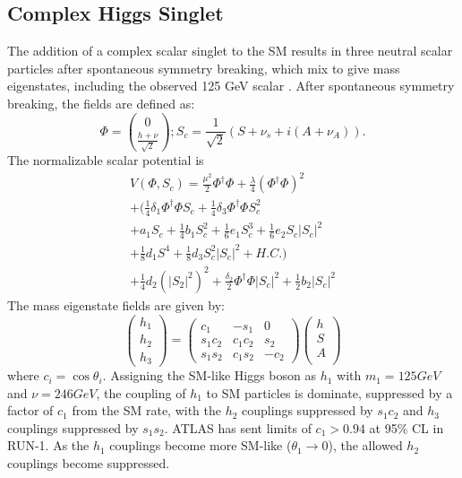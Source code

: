 \subsection{Complex Higgs Singlet}
The addition of a complex scalar singlet to the SM results in three neutral scalar particles after spontaneous symmetry breaking, which mix to give mass eigenstates, including the observed 125 GeV scalar \cite{PhysRevD.97.015022}.\linebreak
\indent After spontaneous symmetry breaking, the fields are defined as:
\begin{equation}
\Phi = \binom{0}{\frac{h+\nu}{\sqrt{2}}}; S_{c} = \frac{1}{\sqrt{2}}(S+\nu_{s} + i(A + \nu_{A})).
\end{equation}
The normalizable scalar potential is
\begin{equation}
\begin{split}
V(\Phi,S_{c}) = \frac{\mu^{2}}{2}\Phi^{\dagger}\Phi + \frac{\lambda}{4}(\Phi^{\dagger}\Phi)^{2} \\
+ (\frac{1}{4}\delta_{1}\Phi^{\dagger}\Phi{}S_{c} + \frac{1}{4}\delta_{3}\Phi^{\dagger}\Phi{}S_{c}^{2} \\
+ a_{1}S_{c} + \frac{1}{4}b_{1}S_{c}^{2} + \frac{1}{6}e_{1}S_{c}^{3} + \frac{1}{6}e_{2}S_{c}|S_{c}|^{2} \\
+ \frac{1}{8}d_{1}S^{4} + \frac{1}{8}d_{3}S_{c}^{2}|S_{c}|^{2} + H.C.) \\
+ \frac{1}{4}d_{2}(|S_{2}|^{2})^{2} + \frac{\delta_{2}}{2}\Phi^{\dagger}\Phi|S_{c}|^{2} + \frac{1}{2}b_{2}|S_{c}|^{2}
\end{split}
\end{equation}
The mass eigenstate fields are given by:
\begin{equation}
\begin{pmatrix}
h_{1}\\
h_{2}\\
h_{3}
\end{pmatrix}
= \begin{pmatrix}
c_{1} & -s_{1} & 0\\
s_{1}c_{2} & c_{1}c_{2} & s_{2}\\
s_{1}s_{2} & c_{1}s_{2} & -c_{2}
\end{pmatrix} 
\begin{pmatrix}
h\\
S\\
A\\
\end{pmatrix}
\end{equation}
where ${c_{i} = \cos{\theta_{i}}}$.
Assigning the SM-like Higgs boson as ${h_{1}}$ with ${m_{1} = 125 GeV}$ and ${\nu = 246 GeV}$,  the coupling of ${h_{1}}$ to SM particles is dominate, suppressed by a factor of ${c_{1}}$ from the SM rate, with the ${h_{2}}$ couplings suppressed by ${s_{1}c_{2}}$ and ${h_{3}}$ couplings suppressed by ${s_{1}s_{2}}$. ATLAS has sent limits of ${c_{1} > 0.94}$ at 95\% CL in RUN-1. As the ${h_{1}}$ couplings become more SM-like (${\theta_{1}\rightarrow{0}}$), the allowed ${h_{2}}$ couplings become suppressed.\linebreak

